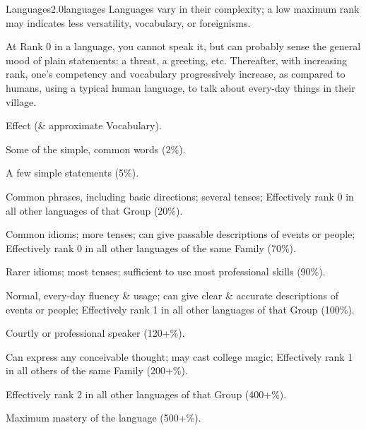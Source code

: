\begin{skill}{Languages}{2.0}{languages}
Languages vary in their complexity; a low maximum rank may indicates
less versatility, vocabulary, or foreignisms.

At Rank 0 in a language, you cannot speak it, but can probably sense
the general mood of plain statements: a threat, a greeting, etc.
Thereafter, with increasing rank, one's competency and vocabulary
progressively increase, as compared to humans, using a typical human
language, to talk about every-day things in their village.

\begin{Description}

\item[Rank] Effect (\& approximate Vocabulary).

\item[1] Some of the simple, common words (2\%).

\item[2] A few simple statements (5\%).

\item[3] Common phrases, including basic directions; several tenses;
Effectively rank 0 in all other languages of that Group (20\%).

\item[4] Common idioms; more tenses; can give passable descriptions of
events or people; Effectively rank 0 in all other languages of the
same Family (70\%).

\item[5] Rarer idioms; most tenses; sufficient to use most professional skills (90\%).

\item[6] Normal, every-day fluency \& usage; can give clear \&
accurate descriptions of events or people; Effectively rank 1 in all
other languages of that Group (100\%).

\item[7] Courtly or professional speaker (120+\%).

\item[8] Can express any conceivable thought; may cast college magic;
Effectively rank 1 in all others of the same Family (200+\%).

\item[9] Effectively rank 2 in all other languages of that Group (400+\%).

\item[10] Maximum mastery of the language (500+\%).

\end{Description}


\end{skill}
